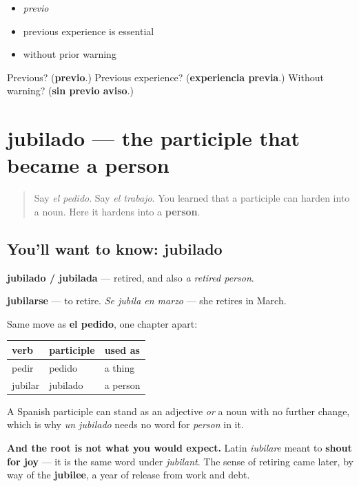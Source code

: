 \begin{itemize}
\raggedright
  \item \emph{previo}
  \item previous experience is essential
  \item without prior warning
\end{itemize}

\begin{tcolorbox}[breakable,colback=teal!4,colframe=teal!35!black,title={Before you move on}]
Previous? (\textbf{previo}.) Previous experience? (\textbf{experiencia previa}.) Without warning? (\textbf{sin previo aviso}.)
\end{tcolorbox}
\section[jubilado]{jubilado — the participle that became a person}

\label{lesson:ES-C435-jubilado}



\begin{quote}
Say \emph{el pedido}. Say \emph{el trabajo}. You learned that a participle can harden into a noun. Here it hardens into a \textbf{person}.
\end{quote}

\subsection*{You'll want to know: jubilado}
\textbf{jubilado / jubilada} — retired, and also \emph{a retired person}.

\textbf{jubilarse} — to retire. \emph{Se jubila en marzo} — she retires in March.

\begin{cousinweb}
Same move as \textbf{el pedido}, one chapter apart:

\noindent
\begin{tabularx}{\linewidth}{@{}>{\raggedright\arraybackslash}X>{\raggedright\arraybackslash}X>{\raggedright\arraybackslash}X@{}}
\toprule
\textbf{verb} & \textbf{participle} & \textbf{used as} \\
\midrule
pedir & pedido & a thing \\
jubilar & jubilado & a person \\
\bottomrule
\end{tabularx}

A Spanish participle can stand as an adjective \emph{or} a noun with no further change, which is why \emph{un jubilado} needs no word for \emph{person} in it.

\textbf{And the root is not what you would expect.} Latin \emph{iubilare} meant to \textbf{shout for joy} — it is the same word under \emph{jubilant}. The sense of retiring came later, by way of the \textbf{jubilee}, a year of release from work and debt.
\end{cousinweb}

